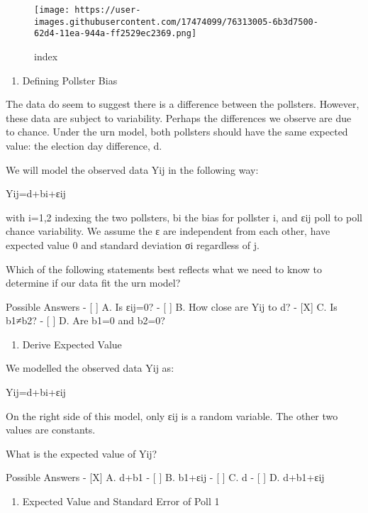 \documentclass[
]{article}
\providecommand{\tightlist}{%
  \setlength{\itemsep}{0pt}\setlength{\parskip}{0pt}}
\begin{document}
\begin{figure}
\centering
\texttt{[image: https://user-images.githubusercontent.com/17474099/76313005-6b3d7500-62d4-11ea-944a-ff2529ec2369.png]}
\caption{index}
\end{figure}

\begin{enumerate}
\def\labelenumi{\arabic{enumi}.}
\setcounter{enumi}{6}
\tightlist
\item
  Defining Pollster Bias
\end{enumerate}

The data do seem to suggest there is a difference between the pollsters.
However, these data are subject to variability. Perhaps the differences
we observe are due to chance. Under the urn model, both pollsters should
have the same expected value: the election day difference, d.

We will model the observed data Yij in the following way:

Yij=d+bi+εij

with i=1,2 indexing the two pollsters, bi the bias for pollster i, and
εij poll to poll chance variability. We assume the ε are independent
from each other, have expected value 0 and standard deviation σi
regardless of j.

Which of the following statements best reflects what we need to know to
determine if our data fit the urn model?

Possible Answers - {[} {]} A. Is εij=0? - {[} {]} B. How close are Yij
to d? - {[}X{]} C. Is b1≠b2? - {[} {]} D. Are b1=0 and b2=0?

\begin{enumerate}
\def\labelenumi{\arabic{enumi}.}
\setcounter{enumi}{7}
\tightlist
\item
  Derive Expected Value
\end{enumerate}

We modelled the observed data Yij as:

Yij=d+bi+εij

On the right side of this model, only εij is a random variable. The
other two values are constants.

What is the expected value of Yij?

Possible Answers - {[}X{]} A. d+b1 - {[} {]} B. b1+εij - {[} {]} C. d -
{[} {]} D. d+b1+εij

\begin{enumerate}
\def\labelenumi{\arabic{enumi}.}
\setcounter{enumi}{8}
\tightlist
\item
  Expected Value and Standard Error of Poll 1
\end{enumerate}
\end{document}
